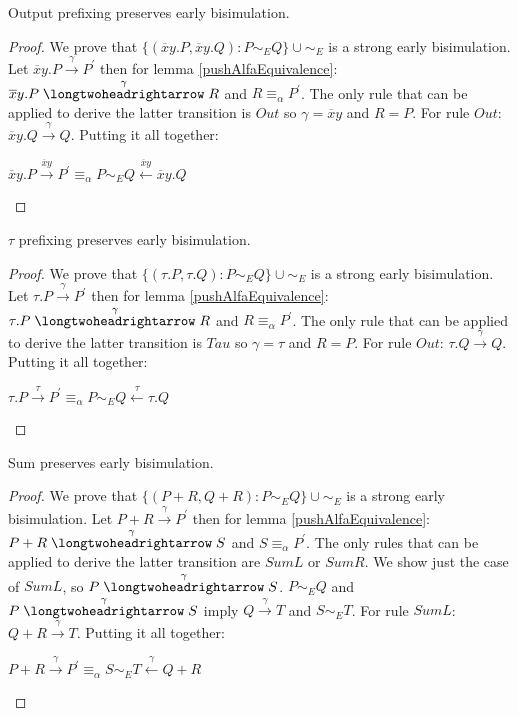 \begin{lemma}\label{outputPreservesEarlyBisimulation}
  Output prefixing preserves early bisimulation. 
  \begin{proof}
    We prove that $\{(\overline{x}y.P, \overline{x}y.Q): P\sim_{E}Q\}\cup \sim_{E}$ is a strong early bisimulation. Let $\overline{x}y.P\xrightarrow{\gamma}P^{'}$ then for lemma \ref{pushAlfaEquivalence}: $\overline{x}y.P\stackrel{\gamma}{\longtwoheadrightarrow} R$ and $R\equiv_{\alpha}P^{'}$. The only rule that can be applied to derive the latter transition is $Out$ so $\gamma = \overline{x}y$ and $R=P$. For rule $Out$: $\overline{x}y.Q\xrightarrow{\gamma} Q$. Putting it all together: 
    \begin{center}
      $\overline{x}y.P\xrightarrow{\overline{x}y}P^{'} \equiv_{\alpha} P \sim_{E} Q \stackrel{\overline{x}y}{\longleftarrow} \overline{x}y.Q$
    \end{center}
  \end{proof}
\end{lemma}


\begin{lemma}\label{tauPreservesEarlyBisimulation}
  $\tau$ prefixing preserves early bisimulation. 
  \begin{proof}
    We prove that $\{(\tau.P, \tau.Q): P\sim_{E}Q\}\cup \sim_{E}$ is a strong early bisimulation. Let $\tau.P\xrightarrow{\gamma}P^{'}$ then for lemma \ref{pushAlfaEquivalence}: $\tau.P\stackrel{\gamma}{\longtwoheadrightarrow} R$ and $R\equiv_{\alpha}P^{'}$. The only rule that can be applied to derive the latter transition is $Tau$ so $\gamma = \tau$ and $R=P$. For rule $Out$: $\tau.Q\xrightarrow{\gamma} Q$. Putting it all together: 
    \begin{center}
      $\tau.P\xrightarrow{\tau}P^{'} \equiv_{\alpha} P \sim_{E} Q \stackrel{\tau}{\longleftarrow} \tau.Q$
    \end{center}
  \end{proof}
\end{lemma}


\begin{lemma}\label{sumPreservesEarlyBisimulation}
  Sum preserves early bisimulation. 
  \begin{proof}
    We prove that $\{(P+R, Q+R): P\sim_{E}Q\}\cup \sim_{E}$ is a strong early bisimulation. Let $P+R\xrightarrow{\gamma}P^{'}$ then for lemma \ref{pushAlfaEquivalence}: $P+R\stackrel{\gamma}{\longtwoheadrightarrow} S$ and $S\equiv_{\alpha}P^{'}$. The only rules that can be applied to derive the latter transition are $SumL$ or $SumR$. We show just the case of $SumL$, so $P\stackrel{\gamma}{\longtwoheadrightarrow} S$. $P\sim_{E} Q$ and $P\stackrel{\gamma}{\longtwoheadrightarrow} S$ imply $Q\xrightarrow{\gamma} T$ and $S\sim_{E} T$. For rule $SumL$: $Q+R\xrightarrow{\gamma} T$. Putting it all together:
    \begin{center}
      $P+R\xrightarrow{\gamma}P^{'} \equiv_{\alpha} S \sim_{E} T \stackrel{\gamma}{\longleftarrow} Q+R$
    \end{center}
  \end{proof}
\end{lemma}

